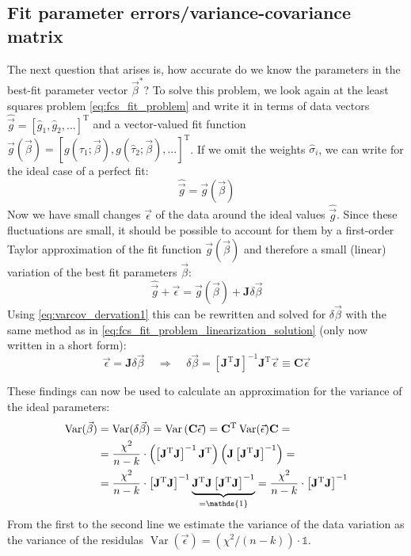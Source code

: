 \documentclass[a4paper,notitlepage]{article}
\DeclareMathOperator{\Var}{Var}
\newcommand{\mat}[1]{\mathrm{\mathbf{#1}}}
\begin{document}
\subsection{Fit parameter errors/variance-covariance matrix}
The next question that arises is, how accurate do we know the parameters in the best-fit parameter vector $\vec{\beta}^\ast$? 
To solve this problem, we look again at the least squares problem \eqref{eq:fcs_fit_problem} and write it in terms of data vectors $\hat{\vec{g}}=[\hat{g}_1,\hat{g}_2,...]^\mathrm{T}$ and a vector-valued fit function $\vec{g}(\vec{\beta})=[g(\hat{\tau}_1;\vec{\beta}), g(\hat{\tau}_2;\vec{\beta}),...]^\mathrm{T}$. If we omit the weights $\hat{\sigma}_i$, we can write for the ideal case of a perfect fit:
\begin{equation}\label{eq:varcov_dervation1}
   \hat{\vec{g}}=\vec{g}(\vec{\beta}) 
\end{equation}
Now we have small changes $\vec{\epsilon}$ of the data around the ideal values $\hat{\vec{g}}$. Since these fluctuations are small, it should be possible to account for them by a first-order Taylor approximation of the fit function $\vec{g}(\vec{\beta})$ and therefore a small (linear) variation of the best fit parameters $\vec{\beta}$:
\begin{equation}\label{eq:varcov_dervation2}
   \hat{\vec{g}}+\vec{\epsilon}=\vec{g}(\vec{\beta})+\mat{J}\delta\vec{\beta} 
\end{equation}
Using \eqref{eq:varcov_dervation1} this can be rewritten and solved for $\delta\vec{\beta}$ with the same method as in \eqref{eq:fcs_fit_problem_linearization_solution} (only now written in a short form):
\begin{equation}\label{eq:varcov_dervation3}
   \vec{\epsilon}=\mat{J}\delta\vec{\beta} \ \ \ \ \ \Rightarrow\ \ \ \ \ \delta\vec{\beta}=\left[\mat{J}^\mathrm{T}\mat{J}\right]^{-1}\mat{J}^\mathrm{T}\vec{\epsilon}\equiv \mat{C}\vec{\epsilon}
\end{equation}

  
These findings can now be used to calculate an approximation for the variance of the ideal parameters:
\begin{align}\label{eq:varcov_dervation4}
    \Var(\vec{\beta})&=\Var(\delta\vec{\beta})=\Var\left(\mat{C}\vec{\epsilon}\right)=\mat{C}^\mathrm{T}\Var(\vec{\epsilon})\mat{C}=\notag\\
    &=\frac{\chi^2}{n-k}\cdot\left(\left[\mat{J}^\mathrm{T}\mat{J}\right]^{-1}\mat{J}^\mathrm{T}\right)\left(\mat{J}\left[\mat{J}^\mathrm{T}\mat{J}\right]^{-1}\right)=\notag\\
    &=\frac{\chi^2}{n-k}\cdot\left[\mat{J}^\mathrm{T}\mat{J}\right]^{-1}\underbrace{\mat{J}^\mathrm{T}\mat{J}\left[\mat{J}^\mathrm{T}\mat{J}\right]^{-1}}_{=\mathds{1}}=\frac{\chi^2}{n-k}\cdot\left[\mat{J}^\mathrm{T}\mat{J}\right]^{-1}
\end{align}
From the first to the second line we estimate the variance of the data variation as the variance of the residulas $\Var(\vec{\epsilon})=(\chi^2/(n-k))\cdot \mathds{1}$. 
\end{document}
